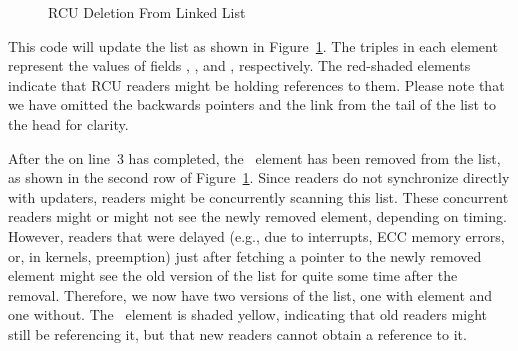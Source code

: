 \begin{figure}[tb]
\begin{center}
\end{center}
\caption{RCU Deletion From Linked List}
\label{fig:defer:RCU Deletion From Linked List}
\end{figure}

This code will update the list as shown in
Figure~\ref{fig:defer:RCU Deletion From Linked List}.
The triples in each element represent the values of fields ,
, and , respectively.
The red-shaded elements
indicate that RCU readers might be holding references to them.
Please note that
we have omitted the backwards pointers and the link from the tail
of the list to the head for clarity.

After the  on
line~3 has completed, the ~element
has been removed from the list, as shown in the second row of
Figure~\ref{fig:defer:RCU Deletion From Linked List}.
Since readers do not synchronize directly with updaters,
readers might be concurrently scanning this list.
These concurrent readers might or might not see the newly removed element,
depending on timing.
However, readers that were delayed (e.g., due to interrupts, ECC memory
errors, or, in  kernels, preemption)
just after fetching a pointer to the newly removed element might
see the old version of the list for quite some time after the
removal.
Therefore, we now have two versions of the list, one with element
 and one without.
The ~element is
shaded yellow, indicating
that old readers might still be referencing it, but that new
readers cannot obtain a reference to it.

